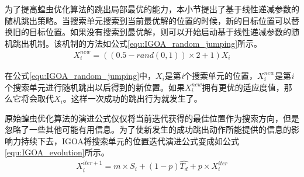 为了提高蝗虫优化算法的跳出局部最优的能力，本小节提出了基于线性递减参数的随机跳出策略。当搜索单元搜索到当前最优解的位置的时候，新的目标位置可以替换旧的目标位置。如果没有搜索到最优解，则可以开始启动基于线性递减参数的随机跳出机制。该机制的方法如公式\ref{equ:IGOA_random_jumping}所示。
\begin{eqnarray}\label{equ:IGOA_random_jumping}
	X_i^{new}=((0.5-rand(0,1))\times 2+1)X_i 
\end{eqnarray}

在公式\ref{equ:IGOA_random_jumping}中，$X_i$是第\emph{i}个搜索单元的位置，$X_i^{new}$是第\emph{i}个搜索单元进行随机跳出以后得到的新位置。如果$X_i^{new}$拥有更优的适应度值，那么它将会取代$X_i$。这样一次成功的跳出行为就发生了。

原始蝗虫优化算法的演进公式仅仅将当前迭代获得的最佳位置作为搜索方向，但是忽略了一些其他可能有用信息。为了使新发生的成功跳出动作所能提供的信息的影响力持续下去，IGOA将搜索单元的位置迭代演进公式变成如公式\ref{equ:IGOA_evolution}所示。
\begin{eqnarray}\label{equ:IGOA_evolution}
	X_i^{iter+1}=m\times S_i+(1-p)\widehat{T_d}+p\times X_i^{iter}
\end{eqnarray}


